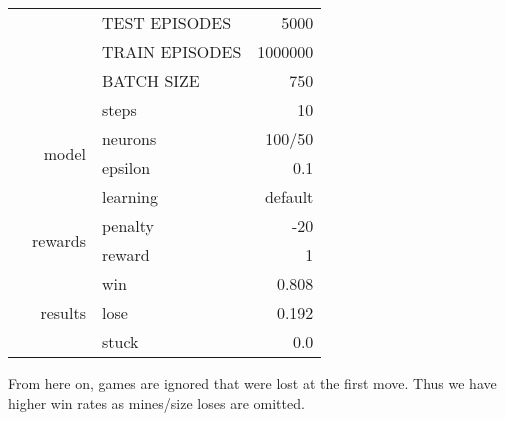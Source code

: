 \documentclass[9pt]{article}
\begin{document}
\begin{tabularx}{\textwidth}{l|r|X|r}
	& & TEST EPISODES & 5000 \\
	& & TRAIN EPISODES & 1000000 \\
	& & BATCH SIZE & 750 \\
	& & steps & 10\\\cline{2-4}
	& \multirow{2}{*}{model} & neurons & 100/50 \\ 
	& & epsilon & 0.1\\
	& & learning & default \\\cline{2-4}
	& \multirow{2}{*}{rewards} & penalty & -20\\
	& & reward& 1\\\cline{2-4}
	& \multirow{3}{*}{results} & win & 0.808 \\
	& & lose & 0.192 \\
	& & stuck & 0.0 \\
	\hline
\end{tabularx}

From here on, games are ignored that were lost at the first move.
Thus we have higher win rates as mines/size loses are omitted.
\end{document}
